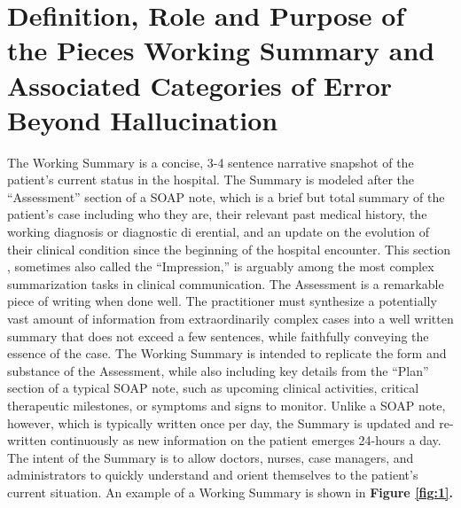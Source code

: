\documentclass{style/myclass}
\begin{document}
\section{Definition, Role and Purpose of the Pieces Working Summary and Associated Categories of Error Beyond Hallucination}

 The Working Summary is a concise, 3-4 sentence narrative snapshot of the patient's current status in the hospital. The Summary is modeled after the “Assessment” section of a SOAP note, \cite{3} which is a brief but total summary of the patient’s case including who they are, their relevant past medical history, the working diagnosis or diagnostic di erential, and an update on the evolution of their clinical condition since the beginning of the hospital encounter. This section , sometimes also called the “Impression,” is arguably among the most complex summarization tasks in clinical communication. The Assessment is a remarkable piece of writing when done well. The practitioner must synthesize a potentially vast amount of information from extraordinarily complex cases into a well written summary that does not exceed a few sentences, while faithfully conveying the essence of the case. The Working Summary is intended to replicate the form and substance of the Assessment, while also including key details from the “Plan” section of a typical SOAP note, such as upcoming clinical activities, critical therapeutic milestones, or symptoms and signs to monitor. Unlike a SOAP note, however, which is typically written once per day, the Summary is updated and re-written continuously as new information on the patient emerges 24-hours a day. The intent of the Summary is to allow doctors, nurses, case managers, and administrators to quickly understand and orient themselves to the patient's current situation. An example of a Working Summary is shown in \textbf{Figure \ref{fig:1}.}
\end{document}
